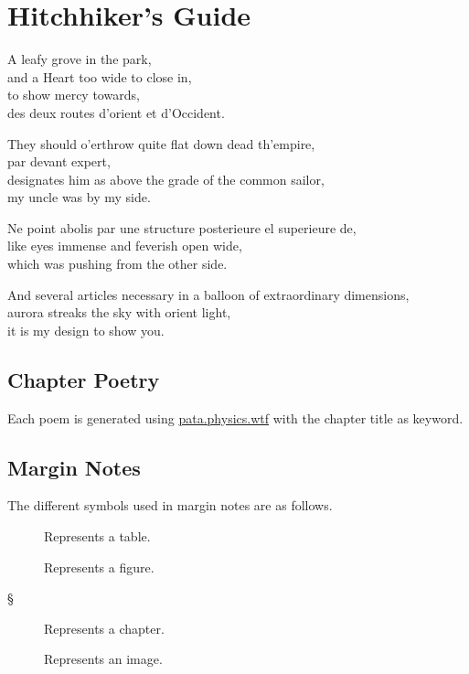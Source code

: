 
\chapter{Hitchhiker's Guide}
\label{ch:guide}

\startcontents[chapters]

A leafy grove in the park, \\
and a Heart too wide to close in, \\
to show mercy towards, \\
des deux routes d'orient et d'Occident.

They should o'erthrow quite flat down dead th'empire, \\
par devant expert, \\
designates him as above the grade of the common sailor, \\
my uncle was by my side.

Ne point abolis par une structure posterieure el superieure de, \\
like eyes immense and feverish open wide, \\
which was pushing from the other side.

And several articles necessary in a balloon of extraordinary dimensions, \\
aurora streaks the sky with orient light, \\
it is my design to show you.


\vfill
\minicontents
\newpage

% 


\section{Chapter Poetry}

Each poem is generated using \url{pata.physics.wtf} with the chapter title as keyword.


\section{Margin Notes}

The different symbols used in margin notes are as follows.

\begin{description}
  \item [] Represents a table.
  \item [] Represents a figure.
  \item [§] Represents a chapter.
  \item [] Represents an image.
\end{description}


